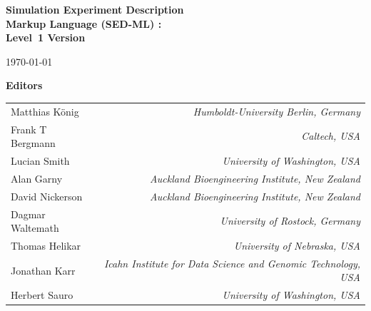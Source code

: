 
\begin{titlepage}


\begin{center}

  \textbf{\sffamily\bfseries\huge
    Simulation Experiment Description\\ Markup Language (SED-ML) :\\[0.3em]
    Level~1 Version~}

\vspace*{0.5in}

\large
\today\\[0.25in]


\vspace{0.5in}

\textbf{\sffamily Editors}\\[7pt]
\begin{tabular}{l>{\hspace*{15pt}}r}
Matthias K\"{o}nig & \emph{Humboldt-University Berlin, Germany}\\
Frank T Bergmann & \emph{Caltech, USA}\\
Lucian Smith & \emph{University of Washington, USA}\\
Alan Garny & \emph{Auckland Bioengineering Institute, New Zealand}\\
David Nickerson & \emph{Auckland Bioengineering Institute, New Zealand}\\
Dagmar Waltemath & \emph{University of Rostock, Germany}\\
Thomas Helikar & \emph{University of Nebraska, USA}\\
Jonathan Karr & \emph{Icahn Institute for Data Science and Genomic Technology, USA}\\
Herbert Sauro & \emph{University of Washington, USA}
\end{tabular}
 

\end{center}
\end{titlepage}
